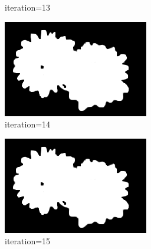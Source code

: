 \documentclass{article}
\begin{document}
\begin{figure}[t]
\begin{subfigure}[t]{0.19\textwidth}
\vspace{-0.6cm}
\caption{iteration=13}
\end{subfigure}
\begin{subfigure}[t]{0.19\textwidth}
\centering
\includegraphics[width=\textwidth]{./images/marginals_iter_14.png}
\vspace{-0.6cm}
\caption{iteration=14}
\end{subfigure}
\begin{subfigure}[t]{0.19\textwidth}
\centering
\includegraphics[width=\textwidth]{./images/marginals_iter_15.png}
\vspace{-0.6cm}
\caption{iteration=15}
\end{subfigure}
\begin{subfigure}[t]{0.19\textwidth}
\centering

\end{subfigure}
\end{figure}
\end{document}
